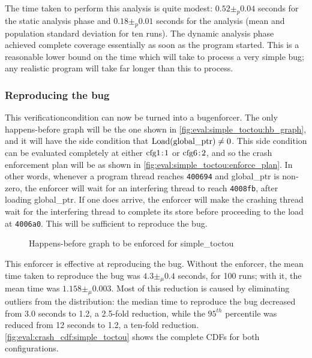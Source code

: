 The time taken to perform this analysis is quite modest: $0.52 \pm_p
0.04$ seconds for the static analysis phase and $0.18 \pm_p 0.01$
seconds for the {\StateMachine} analysis (mean and population standard
deviation for ten runs).  The dynamic analysis phase achieved complete
coverage essentially as soon as the program started.  This is a
reasonable lower bound on the time which {\technique} will take to
process a very simple bug; any realistic program will take far longer
than this to process.

\subsubsection{Reproducing the bug}
This \gls{verificationcondition} can now be turned into a
\gls{bugenforcer}.  The only happens-before graph will be the one
shown in \autoref{fig:eval:simple_toctou:hb_graph}, and it will
have the side condition that $\mathrm{Load}(\mathrm{global\_ptr}) \not= 0$.
This side condition can be evaluated completely at either
$\mathrm{cfg1}\!:\!\mathrm{1}$ or $\mathrm{cfg6}\!:\!\mathrm{2}$, and so the crash enforcement plan
will be as shown in \autoref{fig:eval:simple_toctou:enforce_plan}.
In other words, whenever a program thread reaches \texttt{400694} and
global\_ptr is non-zero, the enforcer will wait for an interfering
thread to reach \texttt{4008fb}, after loading global\_ptr.  If one
does arrive, the enforcer will make the crashing thread wait for the
interfering thread to complete its store before proceeding to the load
at \texttt{4006a0}.  This will be sufficient to reproduce the bug.

\begin{wrapfigure}{r}{7cm}
  \caption{Happens-before graph to be enforced for simple\_toctou}
  \label{fig:eval:simple_toctou:hb_graph}
\end{wrapfigure}
This enforcer is effective at reproducing the bug.  Without the
enforcer, the mean time taken to reproduce the bug was $4.3 \pm_\mu
0.4$ seconds, for 100 runs; with it, the mean time was $1.158 \pm_\mu
0.003$.  Most of this reduction is caused by eliminating outliers from
the distribution: the median time to reproduce the bug decreased from
3.0 seconds to 1.2, a 2.5-fold reduction, while the $95^{th}$
percentile was reduced from 12 seconds to 1.2, a ten-fold reduction.
\autoref{fig:eval:crash_cdf:simple_toctou} shows the complete CDFs
for both configurations.

